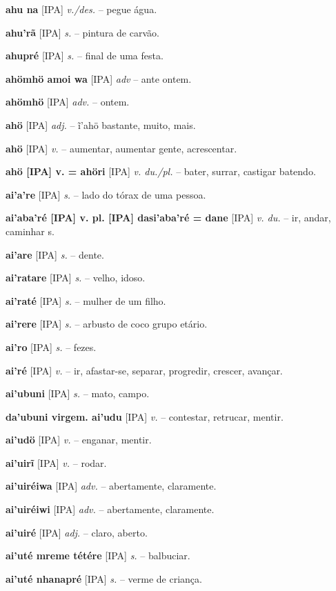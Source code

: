 \textbf{ahu na} [IPA] \textit{v./des.} -- pegue água.

\textbf{ahu'rã} [IPA] \textit{s.} -- pintura de carvão.

\textbf{ahupré} [IPA] \textit{s.} -- final de uma festa.

\textbf{ahömhö amoi wa} [IPA] \textit{adv} -- ante ontem.

\textbf{ahömhö} [IPA] \textit{adv.} -- ontem.

\textbf{ahö} [IPA] \textit{adj.} -- ĩ'ahö bastante, muito, mais.

\textbf{ahö} [IPA] \textit{v.} -- aumentar, aumentar gente, acrescentar.

\textbf{ahö [IPA] v. = ahöri} [IPA] \textit{v. du./pl.} -- bater, surrar, castigar batendo.

\textbf{ai'a're} [IPA] \textit{s.} -- lado do tórax de uma pessoa.

\textbf{ai'aba'ré [IPA] v. pl. [IPA] dasi'aba'ré = dane} [IPA] \textit{v. du.} -- ir, andar, caminhar s.

\textbf{ai'are} [IPA] \textit{s.} -- dente.

\textbf{ai'ratare} [IPA] \textit{s.} -- velho, idoso.

\textbf{ai'raté} [IPA] \textit{s.} -- mulher de um filho.

\textbf{ai'rere} [IPA] \textit{s.} -- arbusto de coco  grupo etário.

\textbf{ai'ro} [IPA] \textit{s.} -- fezes.

\textbf{ai'ré} [IPA] \textit{v.} -- ir, afastar-se, separar, progredir, crescer, avançar.

\textbf{ai'ubuni} [IPA] \textit{s.} -- mato, campo.

\textbf{da'ubuni virgem. ai'udu} [IPA] \textit{v.} -- contestar, retrucar, mentir.

\textbf{ai'udö} [IPA] \textit{v.} -- enganar, mentir.

\textbf{ai'uirĩ} [IPA] \textit{v.} -- rodar.

\textbf{ai'uiréiwa} [IPA] \textit{adv.} -- abertamente, claramente.

\textbf{ai'uiréiwi} [IPA] \textit{adv.} -- abertamente, claramente.

\textbf{ai'uiré} [IPA] \textit{adj.} -- claro, aberto.

\textbf{ai'uté mreme tétére} [IPA] \textit{s.} -- balbuciar.

\textbf{ai'uté nhanapré} [IPA] \textit{s.} -- verme de criança.

